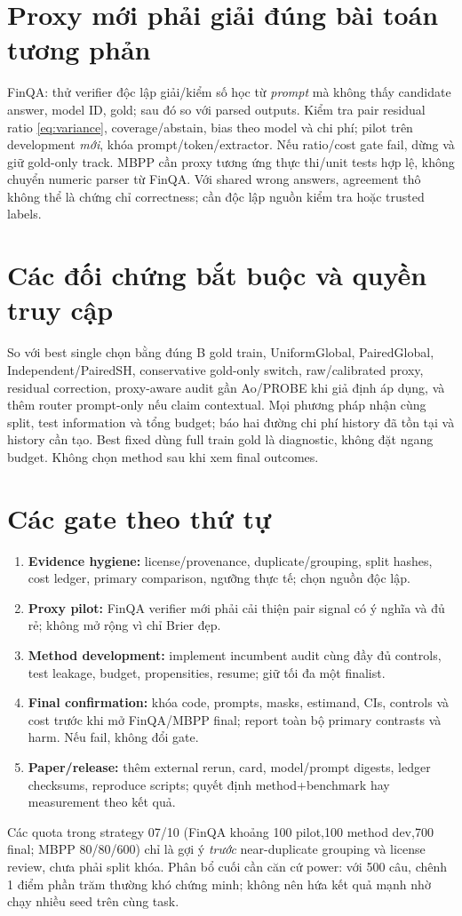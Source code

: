 \documentclass[11pt,a4paper,openany]{book}
\begin{document}
\section{Proxy mới phải giải đúng bài toán tương phản}
FinQA: thử verifier độc lập giải/kiểm số học từ \emph{prompt} mà không thấy candidate answer, model ID, gold; sau đó so với parsed outputs. Kiểm tra pair residual ratio \eqref{eq:variance}, coverage/abstain, bias theo model và chi phí; pilot trên development \emph{mới}, khóa prompt/token/extractor. Nếu ratio/cost gate fail, dừng và giữ gold-only track. MBPP cần proxy tương ứng thực thi/unit tests hợp lệ, không chuyển numeric parser từ FinQA. Với shared wrong answers, agreement thô không thể là chứng chỉ correctness; cần độc lập nguồn kiểm tra hoặc trusted labels.

\section{Các đối chứng bắt buộc và quyền truy cập}
So với best single chọn bằng đúng B gold train, UniformGlobal, PairedGlobal, Independent/PairedSH, conservative gold-only switch, raw/calibrated proxy, residual correction, proxy-aware audit gần Ao/PROBE khi giả định áp dụng, và thêm router prompt-only nếu claim contextual. Mọi phương pháp nhận cùng split, test information và tổng budget; báo hai đường chi phí history đã tồn tại và history cần tạo. Best fixed dùng full train gold là diagnostic, không đặt ngang budget. Không chọn method sau khi xem final outcomes.

\section{Các gate theo thứ tự}
\begin{enumerate}
\item \textbf{Evidence hygiene:} license/provenance, duplicate/grouping, split hashes, cost ledger, primary comparison, ngưỡng thực tế; chọn nguồn độc lập.
\item \textbf{Proxy pilot:} FinQA verifier mới phải cải thiện pair signal có ý nghĩa và đủ rẻ; không mở rộng vì chỉ Brier đẹp.
\item \textbf{Method development:} implement incumbent audit cùng đầy đủ controls, test leakage, budget, propensities, resume; giữ tối đa một finalist.
\item \textbf{Final confirmation:} khóa code, prompts, masks, estimand, CIs, controls và cost trước khi mở FinQA/MBPP final; report toàn bộ primary contrasts và harm. Nếu fail, không đổi gate.
\item \textbf{Paper/release:} thêm external rerun, card, model/prompt digests, ledger checksums, reproduce scripts; quyết định method+benchmark hay measurement theo kết quả.
\end{enumerate}
Các quota trong strategy 07/10 (FinQA khoảng 100 pilot,100 method dev,700 final; MBPP 80/80/600) chỉ là gợi ý \emph{trước} near-duplicate grouping và license review, chưa phải split khóa. Phân bổ cuối cần căn cứ power: với 500 câu, chênh 1 điểm phần trăm thường khó chứng minh; không nên hứa kết quả mạnh nhờ chạy nhiều seed trên cùng task.
\end{document}
